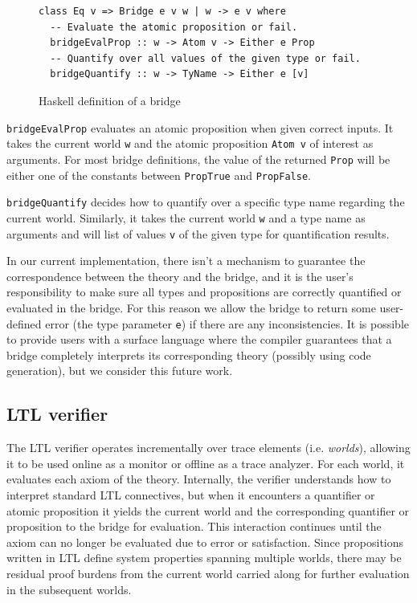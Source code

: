 \documentclass[format=acmsmall, nonacm=true, review=true, screen=true]{acmart}
\newcommand{\mycaption}[1]{\Description{#1}\caption{#1}}
\begin{document}
\begin{figure}[h]
  {
    \fontsize{10}{12}\selectfont
    \begin{verbatim}
class Eq v => Bridge e v w | w -> e v where
  -- Evaluate the atomic proposition or fail.
  bridgeEvalProp :: w -> Atom v -> Either e Prop
  -- Quantify over all values of the given type or fail.
  bridgeQuantify :: w -> TyName -> Either e [v]
\end{verbatim}
  }
  \mycaption{Haskell definition of a bridge}
  \label{fig:bridge-sig}
\end{figure}

\texttt{bridgeEvalProp} evaluates an atomic proposition when given correct inputs. It takes the current world \texttt{w} and the atomic proposition \texttt{Atom v} of interest as arguments.
For most bridge definitions, the value of the returned \texttt{Prop} will be either one of the constants between \texttt{PropTrue} and \texttt{PropFalse}.

\texttt{bridgeQuantify} decides how to quantify over a specific type name regarding the current world.
Similarly, it takes the current world \texttt{w} and a type name as arguments and will list of values \texttt{v} of the given type for quantification results.

In our current implementation, there isn't a mechanism to guarantee the correspondence between the theory and the bridge, and it is the user's responsibility to make sure all types and propositions are correctly quantified or evaluated in the bridge. For this reason we allow the bridge to return some user-defined error (the type parameter \texttt{e}) if there are any inconsistencies.
It is possible to provide users with a surface language where the compiler guarantees that a bridge completely interprets its corresponding theory (possibly using code generation), but we consider this future work.

\subsection{LTL verifier}

The LTL verifier operates incrementally over trace elements (i.e. \textit{worlds}), allowing it to be used online as a monitor or offline as a trace analyzer.
For each world, it evaluates each axiom of the theory. Internally, the verifier understands how to interpret standard LTL connectives, but when it encounters a quantifier or atomic proposition it yields the current world and the corresponding quantifier or proposition to the bridge for evaluation.
This interaction continues until the axiom can no longer be evaluated due to error or satisfaction.
Since propositions written in LTL define system properties spanning multiple worlds, there may be residual proof burdens from the current world carried along for further evaluation in the subsequent worlds.
\end{document}
